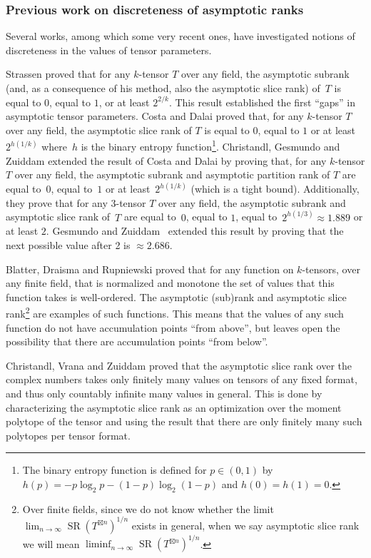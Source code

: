 \documentclass{daj}
\DeclareMathOperator{\slicerank}{SR}
\begin{document}
\subsubsection*{Previous work on discreteness of asymptotic ranks}
Several works, among which some very recent ones, have investigated notions of discreteness in the values of tensor parameters.

Strassen \cite[Lemma~3.7]{strassen1988asymptotic} proved that for any $k$-tensor $T$ over any field, the asymptotic subrank (and, as a consequence of his method, also the asymptotic slice rank) of~$T$ is equal to $0$, equal to $1$, or at least $2^{2/k}$. This result established the first ``gaps'' in asymptotic tensor parameters.
%
Costa and Dalai \cite{DBLP:journals/jcta/CostaD21} proved that, for any $k$-tensor $T$ over any field, the asymptotic slice rank of $T$ is equal to $0$, equal to $1$ or at least $2^{h(1/k)}$ where~$h$ is the binary entropy function\footnote{The binary entropy function is defined for $p \in (0,1)$ by $h(p) = - p\log_2 p - (1-p) \log_2 (1-p)$ and $h(0) = h(1) = 0$.}.
%
Christandl, Gesmundo and Zuiddam \cite{cgz} extended the result of Costa and Dalai by proving that, for any $k$-tensor $T$ over any field, the asymptotic subrank and asymptotic partition rank of $T$ are equal to~$0$, equal to~$1$ or at least~$2^{h(1/k)}$ (which is a tight bound). Additionally, they prove that for any $3$-tensor $T$ over any field, the asymptotic subrank and asymptotic slice rank of~$T$ are equal to~$0$, equal to $1$, equal to~$2^{h(1/3)}\approx 1.889$ or at least $2$. Gesmundo and Zuiddam~\cite{gesmundo2023gap} extended this result by proving that the next possible value after 2 is $\approx 2.686$.

Blatter, Draisma and Rupniewski \cite{bdr} proved that for any function on $k$-tensors, over any finite field, that is normalized and monotone the set of values that this function takes is well-ordered. The asymptotic (sub)rank and asymptotic slice rank\footnote{Over finite fields, since we do not know whether the limit $\lim_{n\to\infty}\slicerank(T^{\boxtimes n})^{1/n}$ exists in general, when we say asymptotic slice rank we will mean $\liminf_{n\to\infty} \slicerank(T^{\boxtimes n})^{1/n}$.} %
are examples of such functions. This means that the values of any such function do not have accumulation points ``from above'', but leaves open the possibility that there are accumulation points ``from below''.

Christandl, Vrana and Zuiddam \cite{MR4495838} proved that the asymptotic slice rank over the complex numbers takes only finitely many values on tensors of any fixed format, %
and thus only countably infinite many values in general. This is done by characterizing the asymptotic slice rank as an optimization over the moment polytope of the tensor and using the result that there are only finitely many such polytopes per tensor format.
\end{document}
